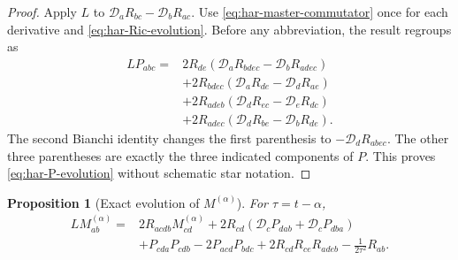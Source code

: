 \documentclass[10pt]{coll-l}
\newtheorem{proposition}[theorem]{Proposition}
\theoremstyle{definition}
\theoremstyle{remark}
\numberwithin{section}{chapter}
\numberwithin{equation}{chapter}
\begin{document}
\begin{proof}
Apply $L$ to $\mathcal D_aR_{bc}-\mathcal D_bR_{ac}$.  Use
\eqref{eq:har-master-commutator} once for each derivative and
\eqref{eq:har-Ric-evolution}.  Before any abbreviation, the result regroups
as
\begin{align*}
 LP_{abc}={}&2R_{de}
  (\mathcal D_aR_{bdec}-\mathcal D_bR_{adec})\\
 &+2R_{bdec}(\mathcal D_aR_{de}-\mathcal D_dR_{ae})\\
 &+2R_{adeb}(\mathcal D_dR_{ec}-\mathcal D_eR_{dc})\\
 &+2R_{adec}(\mathcal D_dR_{be}-\mathcal D_bR_{de}).
\end{align*}
The second Bianchi identity changes the first parenthesis to
$-\mathcal D_dR_{abec}$.  The other three parentheses are exactly the
three indicated components of $P$.  This proves
\eqref{eq:har-P-evolution} without schematic star notation.
\end{proof}

\begin{proposition}[Exact evolution of $M^{(\alpha)}$]
\label{prop:har-M-evolution}
For $\tau=t-\alpha$,
\begin{equation}
 \begin{split}
 LM^{(\alpha)}_{ab}={}&2R_{acdb}M^{(\alpha)}_{cd}
  +2R_{cd}(\mathcal D_cP_{dab}+\mathcal D_cP_{dba})\\
 &+P_{cda}P_{cdb}-2P_{acd}P_{bdc}
  +2R_{cd}R_{ce}R_{adeb}
  -\frac1{2\tau^2}R_{ab}.                              \label{eq:har-M-evolution}
 \end{split}
\end{equation}
\end{proposition}
\end{document}
